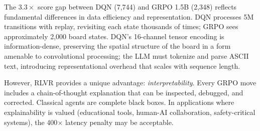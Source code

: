 \documentclass[letterpaper]{article}
\begin{document}
\begin{table}[t]
\centering
\caption{Head-to-head comparison across seven dimensions. Classical RL dominates on performance and efficiency; RLVR provides unique interpretability through chain-of-thought reasoning.}
\label{tab:head_to_head}
\end{table}

The $3.3\times$ score gap between DQN (7,744) and GRPO 1.5B (2,348) reflects fundamental differences in data efficiency and representation. DQN processes 5M transitions with replay, revisiting each state thousands of times; GRPO sees approximately 2,000 board states. DQN's 16-channel tensor encoding is information-dense, preserving the spatial structure of the board in a form amenable to convolutional processing; the LLM must tokenize and parse ASCII text, introducing representational overhead that scales with sequence length.

However, RLVR provides a unique advantage: \emph{interpretability}. Every GRPO move includes a chain-of-thought explanation that can be inspected, debugged, and corrected. Classical agents are complete black boxes. In applications where explainability is valued (educational tools, human-AI collaboration, safety-critical systems), the 400$\times$ latency penalty may be acceptable.
\end{document}
